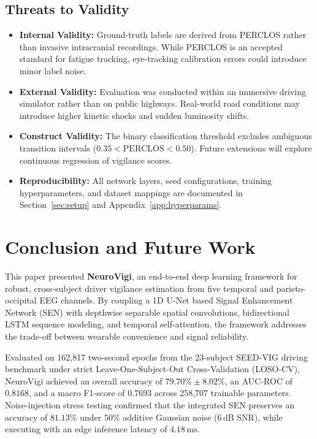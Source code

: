 \documentclass[conference]{IEEEtran}
\begin{document}
\subsection{Threats to Validity}
\begin{itemize}[leftmargin=*]
    \item \textbf{Internal Validity:} Ground-truth labels are derived from PERCLOS rather than invasive intracranial recordings. While PERCLOS is an accepted standard for fatigue tracking, eye-tracking calibration errors could introduce minor label noise.
    \item \textbf{External Validity:} Evaluation was conducted within an immersive driving simulator rather than on public highways. Real-world road conditions may introduce higher kinetic shocks and sudden luminosity shifts.
    \item \textbf{Construct Validity:} The binary classification threshold excludes ambiguous transition intervals ($0.35 < \text{PERCLOS} < 0.50$). Future extensions will explore continuous regression of vigilance scores.
    \item \textbf{Reproducibility:} All network layers, seed configurations, training hyperparameters, and dataset mappings are documented in Section~\ref{sec:setup} and Appendix~\ref{app:hyperparams}.
\end{itemize}

\section{Conclusion and Future Work}
\label{sec:conclusion}

This paper presented \textbf{NeuroVigi}, an end-to-end deep learning framework for robust, cross-subject driver vigilance estimation from five temporal and parieto-occipital EEG channels. By coupling a 1D U-Net based Signal Enhancement Network (SEN) with depthwise separable spatial convolutions, bidirectional LSTM sequence modeling, and temporal self-attention, the framework addresses the trade-off between wearable convenience and signal reliability.

Evaluated on 162,817 two-second epochs from the 23-subject SEED-VIG driving benchmark under strict Leave-One-Subject-Out Cross-Validation (LOSO-CV), NeuroVigi achieved an overall accuracy of $\mathbf{79.70\% \pm 8.02\%}$, an AUC-ROC of $\mathbf{0.8168}$, and a macro F1-score of $\mathbf{0.7693}$ across 258,707 trainable parameters. Noise-injection stress testing confirmed that the integrated SEN preserves an accuracy of $81.13\%$ under $50\%$ additive Gaussian noise ($6\,\text{dB}$ SNR), while executing with an edge inference latency of $4.18\,\text{ms}$.
\end{document}
